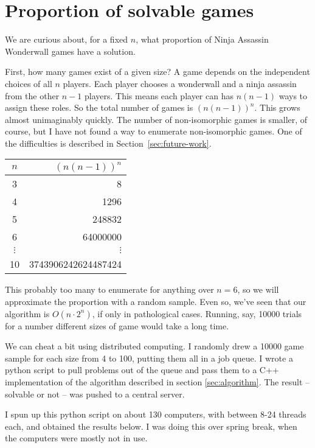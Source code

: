 \documentclass[12pt,x11names, rgb]{article}
\begin{document}
\section{Proportion of solvable games}
    \label{sec:prob}
    We are curious about, for a fixed $n$, what proportion of Ninja Assassin Wonderwall games have a solution. 

    First, how many games exist of a given size? A game depends on the independent choices of all $n$ players. Each player chooses a wonderwall and a ninja assassin from the other $n-1$ players. This means each player can has $n(n-1)$ ways to assign these roles. So the total number of games is $\displaystyle \left(n(n-1)\right)^n$. This grows almost unimaginably quickly. The number of non-isomorphic games is smaller, of course, but I have not found a way to enumerate non-isomorphic games. One of the difficulties is described in Section~\ref{sec:future-work}.
    \begin{center}
        \begin{tabular}{c | r}
        $n$ & $\displaystyle \left(n(n-1)\right)^n$\\
        \hline
        3 & 8\\
        4 & 1296 \\
        5 & 248832 \\
        6 & 64000000\\
        $\vdots$ & $\vdots$ \\
        10 & 3743906242624487424
        \end{tabular}
    \end{center}
    This probably too many to enumerate for anything over $n=6$, so we will approximate the proportion with a random sample. Even so, we've seen that our algorithm is $O(n\cdot 2^n)$, if only in pathological cases. Running, say, 10000 trials for a number different sizes of game would take a long time.

    We can cheat a bit using distributed computing. I randomly drew a 10000 game sample for each size from 4 to 100, putting them all in a job queue. I wrote a python script to pull problems out of the queue and pass them to a C++ implementation of the algorithm described in section \ref{sec:algorithm}. The result -- solvable or not -- was pushed to a central server. 

    I spun up this python script on about 130 computers, with between 8-24 threads each, and obtained the results below. I was doing this over spring break, when the computers were mostly not in use.
\end{document}
